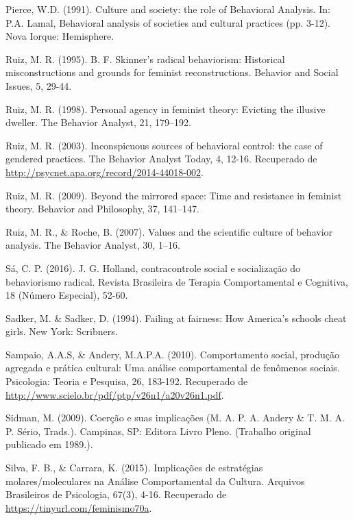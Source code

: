 \hangindent=25pt
\noindent Pierce, W.D. (1991). Culture and society: the role of Behavioral Analysis. In: P.A. Lamal, Behavioral analysis of societies and cultural practices (pp. 3-12). Nova Iorque: Hemisphere.

\hangindent=25pt
\noindent Ruiz, M. R. (1995). B. F. Skinner’s radical behaviorism: Historical misconstructions and grounds for feminist reconstructions. Behavior and Social Issues, 5, 29-44.

\hangindent=25pt
\noindent Ruiz, M. R. (1998). Personal agency in feminist theory: Evicting the illusive dweller. The Behavior Analyst, 21, 179–192.

\hangindent=25pt
\noindent Ruiz, M. R. (2003). Inconspicuous sources of behavioral control: the case of gendered practices. The Behavior Analyst Today, 4, 12-16. Recuperado de \url{http://psycnet.apa.org/record/2014-44018-002}.

\hangindent=25pt
\noindent Ruiz, M. R. (2009). Beyond the mirrored space: Time and resistance in feminist theory. Behavior and Philosophy, 37, 141–147.

\hangindent=25pt
\noindent Ruiz, M. R., \& Roche, B. (2007). Values and the scientific culture of behavior analysis. The Behavior Analyst, 30, 1–16.

\hangindent=25pt
\noindent Sá, C. P. (2016). J. G. Holland, contracontrole social e socialização do behaviorismo radical. Revista Brasileira de Terapia Comportamental e Cognitiva, 18 (Número Especial), 52-60.

\hangindent=25pt
\noindent Sadker, M. \& Sadker, D. (1994). Failing at fairness: How America’s schools cheat girls. New York: Scribners.

\hangindent=25pt
\noindent Sampaio, A.A.S, \& Andery, M.A.P.A. (2010). Comportamento social, produção agregada e prática cultural: Uma análise comportamental de fenômenos sociais. Psicologia: Teoria e Pesquisa, 26, 183-192. Recuperado de \url{http://www.scielo.br/pdf/ptp/v26n1/a20v26n1.pdf}.

\hangindent=25pt
\noindent Sidman, M. (2009). Coerção e suas implicações (M. A. P. A. Andery \& T. M. A. P. Sério, Trads.). Campinas, SP: Editora Livro Pleno. (Trabalho original publicado em 1989.).

\hangindent=25pt
\noindent Silva, F. B., \& Carrara, K. (2015). Implicações de estratégias molares/moleculares na Análise Comportamental da Cultura. Arquivos Brasileiros de Psicologia, 67(3), 4-16. Recuperado de \url{https://tinyurl.com/feminismo70a}.

